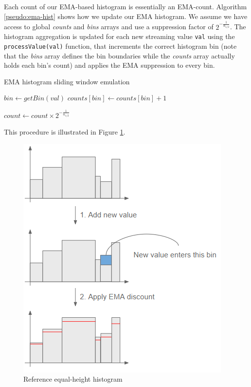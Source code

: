 \documentclass[sigconf]{acmart}
\begin{document}
Each count of our EMA-based histogram is essentially an EMA-count. Algorithm \ref{pseudo:ema-hist} shows how we update our EMA histogram. We assume we have access to global \textit{counts} and \textit{bins} arrays and use a suppression factor of $2^{- \frac{1}{n_{1/2}}}$. The histogram aggregation is updated for each new streaming value \texttt{val} using the \texttt{processValue(val)} function, that increments the correct histogram bin (note that the \textit{bins} array defines the bin boundaries while the \textit{counts} array actually holds each bin's count) and applies the EMA suppression to every bin.
\begin{algorithm}[!htb]
    \caption[EMA histogram]{EMA histogram sliding window emulation}
    \label{pseudo:ema-hist}
    \begin{algorithmic}[1]
            \State {}
        \EndFunction
        
            \State $bin \gets getBin(val)$
            \State $counts[bin] \gets counts[bin] + 1$ 
            
             
                \State $count \gets count \times 2^{- \frac{1}{n_{1/2}}}$
            \EndFor
        \EndFunction
    \end{algorithmic}
\end{algorithm}
This procedure is illustrated in Figure \ref{fig:EMA-hist-build}.
\begin{figure}[!htb]
    \begin{center}
      \includegraphics[scale=0.6]{figures/ema-hist.png}
      \caption[]{Reference equal-height histogram}
      \label{fig:EMA-hist-build}
    \end{center}
\end{figure}
\end{document}
